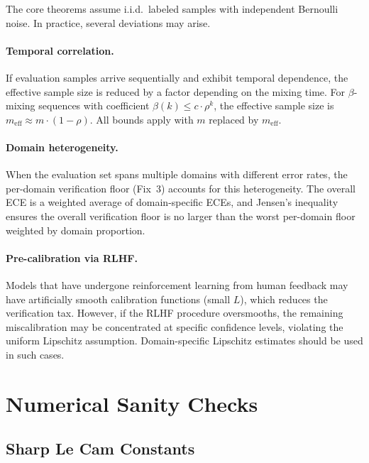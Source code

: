\documentclass{article}
\newcommand{\Lip}{L}
\newcommand{\nsamples}{m}
\newcommand{\critexp}{\beta}
\newcommand{\tvdrift}{\rho}
\theoremstyle{definition}
\begin{document}
The core theorems assume i.i.d.\ labeled samples with independent Bernoulli noise. In practice, several deviations may arise.

\paragraph{Temporal correlation.} If evaluation samples arrive sequentially and exhibit temporal dependence, the effective sample size is reduced by a factor depending on the mixing time. For $\critexp$-mixing sequences with coefficient $\critexp(k) \leq c \cdot \tvdrift^k$, the effective sample size is $\nsamples_{\mathrm{eff}} \approx \nsamples \cdot (1-\tvdrift)$. All bounds apply with $\nsamples$ replaced by $\nsamples_{\mathrm{eff}}$.

\paragraph{Domain heterogeneity.} When the evaluation set spans multiple domains with different error rates, the per-domain verification floor (Fix~3) accounts for this heterogeneity. The overall ECE is a weighted average of domain-specific ECEs, and Jensen's inequality ensures the overall verification floor is no larger than the worst per-domain floor weighted by domain proportion.

\paragraph{Pre-calibration via RLHF.} Models that have undergone reinforcement learning from human feedback may have artificially smooth calibration functions (small $\Lip$), which reduces the verification tax. However, if the RLHF procedure oversmooths, the remaining miscalibration may be concentrated at specific confidence levels, violating the uniform Lipschitz assumption. Domain-specific Lipschitz estimates should be used in such cases.

\section{Numerical Sanity Checks}
\label{app:numerical}

\subsection{Sharp Le Cam Constants}
\end{document}
